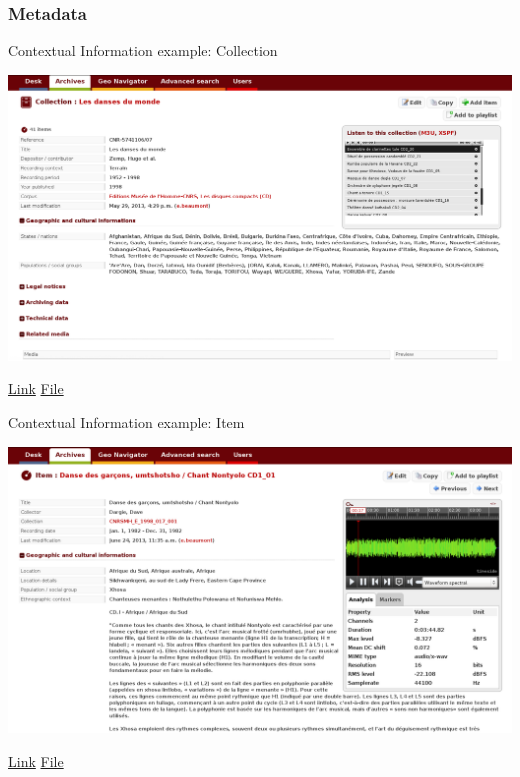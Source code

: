 \documentclass[final, hyperref, table]{beamer}
\begin{document}
\subsubsection{Metadata}
\begin{frame}[label=metadata_example]{Contextual Information example: Collection}
  \begin{center}
    \includegraphics[width=1.1\textwidth]{telemeta_metadata_collection.png}
  \end{center}
\href{http://archives.crem-cnrs.fr/archives/collections/CNRSMH_E_1998_017_001/}{Link}
 \href{./captures/Collection.html}{File}
\hyperlink{telemeta_metadata}{}
\end{frame}
\begin{frame}{Contextual Information example: Item}
  \begin{center}
    \includegraphics[width=1.1\textwidth]{telemeta_metadata_item.png}
  \end{center}
  \href{http://archives.crem-cnrs.fr/archives/items/CNRSMH_E_1998_017_001_001_01/}{Link}
 \href{./captures/Item.html}{File}
\hyperlink{telemeta_metadata}{}
\end{frame}
\end{document}
